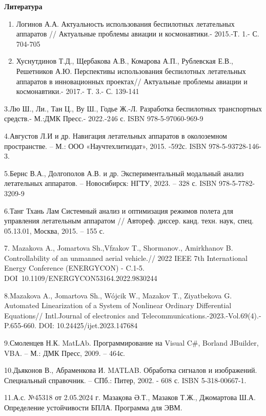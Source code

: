 {\bfseries Литература}

\begin{enumerate}
\def\labelenumi{\arabic{enumi}.}
\item
  Логинов А.А. Актуальность использования беспилотных летательных
  аппаратов // Актуальные проблемы авиации и космонавтики.- 2015.-Т. 1.-
  С. 704-705
\item
  Хуснутдинов Т.Д., Щербакова А.В., Комарова А.П., Рублевская Е.В.,
  Решетников А.Ю. Перспективы использования беспилотных летательных
  аппаратов в инновационных проектах// Актуальные проблемы авиации и
  космонавтики.- 2017.- Т. 3.- С. 139-141
\end{enumerate}

3.Лю Ш., Ли., Тан Ц., Ву Ш., Годье Ж.-Л. Разработка беспилотных
транспортных средств.- М.:ДМК Пресс.- 2022.-246 с. ISBN
978-5-97060-969-9

4.Августов Л.И и др. Навигация летательных аппаратов в околоземном
пространстве. -- М.: ООО «Научтехлитиздат», 2015. -592с. ISBN
978-5-93728-146-3.

5.Бернс В.А., Долгополов А.В. и др. Экспериментальный модальный анализ
летательных аппаратов. -- Новосибирск: НГТУ, 2023. -- 328 с. ISBN
978-5-7782-3209-9

6.Танг Тхань Лам Системный анализ и оптимизация режимов полета для
управления летательным аппаратом // Автореф. диссер. канд. техн. наук,
спец. 05.13.01, Москва, 2015. -- 155 с.

7. Mazakova A., Jomartova Sh.,Vfzakov T., Shormanov., Amirkhanov B.
Controllability of an unmanned aerial vehicle.// 2022 IEEE 7th
International Energy Conference (ENERGYCON) - C.1-5.
DOI~10.1109/ENERGYCON53164.2022.9830244

8.Mazakova A., Jomartova Sh., Wójcik W., Mazakov T., Ziyatbekova G.
Automated Linearization of a System of Nonlinear Ordinary Differential
Equations// Intl.Journal of electronics and
Telecommunications.-2023.-Vol.69(4).- P.655-660. DOI:
10.24425/ijet.2023.147684

9.Смоленцев Н.К. MatLAb. Программирование на Visual C\#, Borland
JBuilder, VBA. -- М.: ДМК Пресс, 2009. -- 464с.

10.Дьяконов В., Абраменкова И. MATLAB. Обработка сигналов и изображений.
Специальный справочник. -- СПб.: Питер, 2002. - 608 с. ISBN
5-318-00667-1.

11.А.с. №45318 от 2.05.2024 г. Мазақова Ә.Т., Мазаков Т.Ж., Джомартова
Ш.А. Определение устойчивости БПЛА. Программа для ЭВМ.

